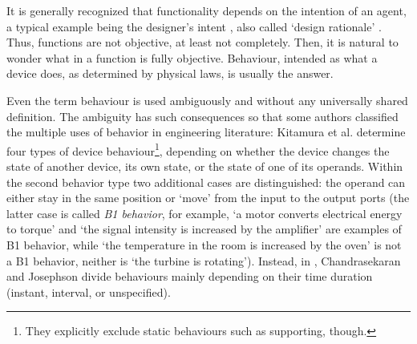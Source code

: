 \documentclass[sw]{iosart2x}
\newcommand{\firstTimeKeyWord}[1]{\textit{#1}}
\newcommand{\quotes}[1]{`#1'}
\newcommand{\TODO}[1]{{\color{red} #1
}}
\begin{document}
It is generally recognized that functionality depends on the intention of an agent, a typical example being the designer's intent  \cite{kitamuraOntologyBasedFunctionalKnowledgeModeling2004}, also called \quotes{design rationale} \cite{chandrasekaranFunctionalRepresentationDesign1993}. 
Thus, functions are not objective, at least not completely. 
Then, it is natural to wonder what in a function is fully objective. Behaviour, intended as what a device does, as determined by physical laws, is usually the answer.    


Even the term behaviour is used ambiguously and without any universally shared definition. 
The ambiguity has such consequences so that some authors classified the multiple uses of behavior in engineering literature: 
Kitamura et al. \cite{kitamuraOntologyBasedFunctionalKnowledgeModeling2004} determine four types of device behaviour\footnote{They explicitly exclude static behaviours such as supporting, though.}, depending on whether the device changes the state of another device, its own state, or the state of one of its operands. Within the second behavior type two additional cases are distinguished: the operand can either stay in the same position or `move' from the input to the output ports (the latter case is called \firstTimeKeyWord{B1 behavior}, for example, \quotes{a motor converts electrical energy to torque} and \quotes{the signal intensity is increased by the amplifier} are examples of B1 behavior, while \quotes{the temperature in the room is increased by the oven} is not a B1 behavior, neither is \quotes{the turbine is rotating}).
Instead, in \cite{chandrasekaranFunctionDeviceRepresentation2000}, Chandrasekaran and Josephson divide behaviours mainly depending on their time duration (instant, interval, or unspecified).

\end{document}
